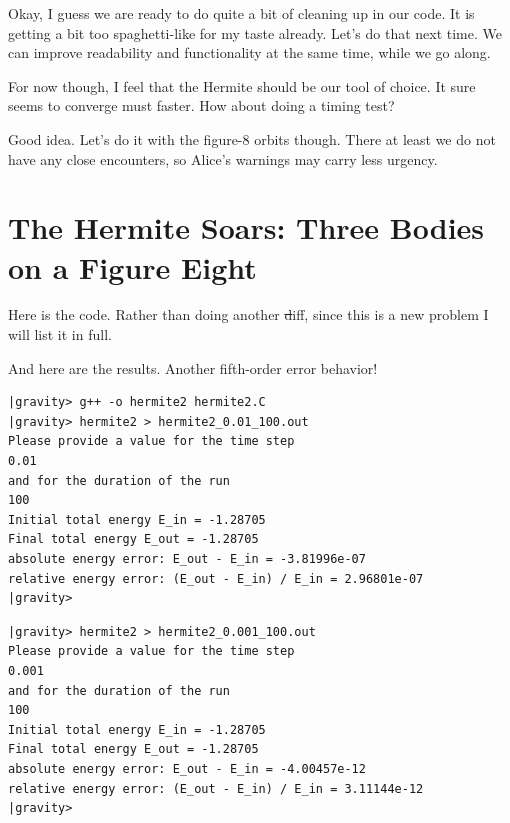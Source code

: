 \bob
Okay, I guess we are ready to do quite a bit of cleaning up in our code.
It is getting a bit too spaghetti-like for my taste already.  Let's do
that next time.  We can improve readability and functionality at the
same time, while we go along.

\carol
For now though, I feel that the Hermite should be our tool of choice.
It sure seems to converge must faster.  How about doing a timing test?

\bob
Good idea.  Let's do it with the figure-8 orbits though.  There at
least we do not have any close encounters, so Alice's warnings may
carry less urgency.

\cba

\section{The Hermite Soars: Three Bodies on a Figure Eight}

\abc

\bob
Here is the code.  Rather than doing another {\st diff}, since this is
a new problem I will list it in full.

\cba


\abc

\bob
And here are the results.  Another fifth-order error behavior!

\cba

\begin{small}
\begin{verbatim}
|gravity> g++ -o hermite2 hermite2.C
|gravity> hermite2 > hermite2_0.01_100.out
Please provide a value for the time step
0.01
and for the duration of the run
100
Initial total energy E_in = -1.28705
Final total energy E_out = -1.28705
absolute energy error: E_out - E_in = -3.81996e-07
relative energy error: (E_out - E_in) / E_in = 2.96801e-07
|gravity>
\end{verbatim}
\end{small}

\begin{small}
\begin{verbatim}
|gravity> hermite2 > hermite2_0.001_100.out
Please provide a value for the time step
0.001
and for the duration of the run
100
Initial total energy E_in = -1.28705
Final total energy E_out = -1.28705
absolute energy error: E_out - E_in = -4.00457e-12
relative energy error: (E_out - E_in) / E_in = 3.11144e-12
|gravity>
\end{verbatim}
\end{small}

